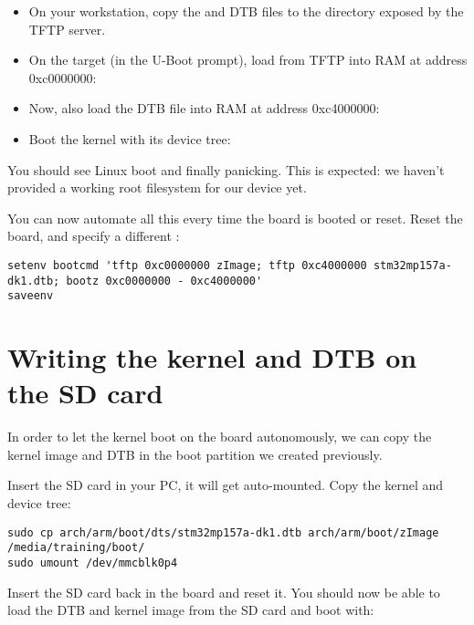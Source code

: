 \begin{itemize}

\item On your workstation, copy the  and DTB files to the
  directory exposed by the TFTP server.

\item On the target (in the U-Boot prompt), load  from
  TFTP into RAM at address 0xc0000000:\\

\item Now, also load the DTB file into RAM at address 0xc4000000:\\

\item Boot the kernel with its device tree:\\

\end{itemize}

You should see Linux boot and finally panicking. This is expected: we
haven't provided a working root filesystem for our device yet.

You can now automate all this every time the board is booted or
reset. Reset the board, and specify a different :

{\scriptsize
\begin{verbatim}
setenv bootcmd 'tftp 0xc0000000 zImage; tftp 0xc4000000 stm32mp157a-dk1.dtb; bootz 0xc0000000 - 0xc4000000'
saveenv
\end{verbatim}
}

\section{Writing the kernel and DTB on the SD card}

In order to let the kernel boot on the board autonomously, we can
copy the kernel image and DTB in the boot partition we created
previously.

Insert the SD card in your PC, it will get auto-mounted. Copy the
kernel and device tree:
\begin{verbatim}
sudo cp arch/arm/boot/dts/stm32mp157a-dk1.dtb arch/arm/boot/zImage /media/training/boot/
sudo umount /dev/mmcblk0p4
\end{verbatim}

Insert the SD card back in the board and reset it. You should now be
able to load the DTB and kernel image from the SD card and boot with:

